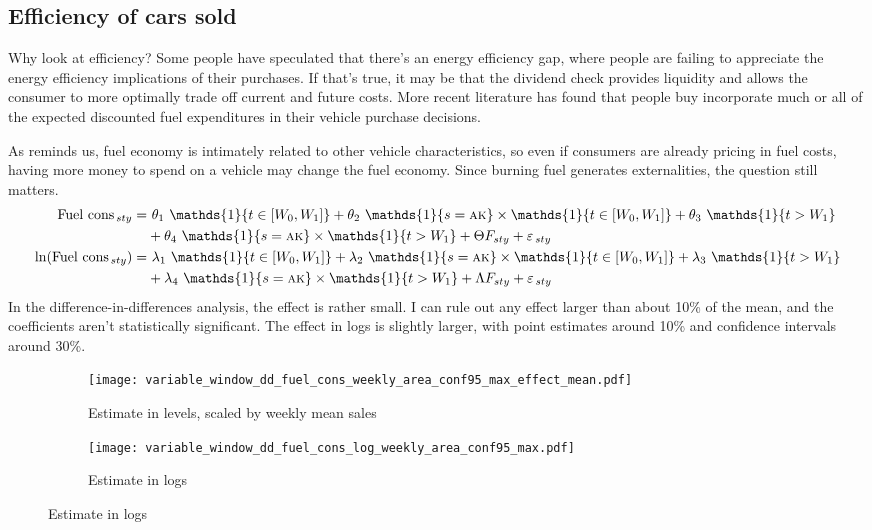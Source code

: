 \documentclass[11pt,letterpaper,oneside]{article}
\let\originalleft\left
\let\originalright\right
\renewcommand{\left}{\mathopen{}\mathclose\bgroup\originalleft}
\renewcommand{\right}{\aftergroup\egroup\originalright}
\newcommand{\indicator}[1]{\mathds{1}\left\{#1\right\}}
\newcommand{\anticipation}{\indicator{t \in [W_0, W_1]}}
\newcommand{\isAlaska}{\indicator{s = \textsc{ak}}}
\newcommand{\postWindow}{\indicator{t > W_1}}
\newcommand{\ddEqn}[3]{%
\text{#1}_{\, sty} = & \  #2_1 \ \anticipation + #2_2 \ \isAlaska \times \anticipation + #2_3 \ \postWindow \\ \nonumber
&+ #2_4 \ \isAlaska \times \postWindow + #3 F_{ sty} + \varepsilon_{\, sty}
}
\newcommand{\ddEqnLog}[3]{%
\ln\left(\text{#1}_{\, sty}\right) = & \  #2_1 \ \anticipation + #2_2 \ \isAlaska \times \anticipation + #2_3 \ \postWindow \\ \nonumber
&+ #2_4 \ \isAlaska \times \postWindow + #3 F_{ sty} + \varepsilon_{\, sty}
}
\begin{document}
\begin{doublespacing}
\subsection{Efficiency of cars sold}

Why look at efficiency?
Some people have speculated that there's an energy efficiency gap, where people are failing to appreciate the energy efficiency implications of their purchases.
If that's true, it may be that the dividend check provides liquidity and allows the consumer to more optimally trade off current and future costs.
More recent literature has found that people buy incorporate much \parencite{allcott2014gasoline} or all \parencite{busse2013consumers, grigolon2014consumer, sallee2016consumers} of the expected discounted fuel expenditures in their vehicle purchase decisions.

As \textcite{kiso2013automobilefueleconomy} reminds us, fuel economy is intimately related to other vehicle characteristics, so even if consumers are already pricing in fuel costs, having more money to spend on a vehicle may change the fuel economy.
Since burning fuel generates externalities, the question still matters. %
\begin{align}
    \label{eqn:fuel-cons}
    \ddEqn{Fuel cons}{\theta}{\Theta} \\
    \label{eqn:log-fuel-cons}
    \ddEqnLog{Fuel cons}{\lambda}{\Lambda}
\end{align}
In the difference\hyp{}in\hyp{}differences analysis, the effect is rather small.
I can rule out any effect larger than about 10\% of the mean, and the coefficients aren't statistically significant.
The effect in logs is slightly larger, with point estimates around 10\% and confidence intervals around 30\%.


\begin{figure}[!hbtp]
    \caption{Fuel consumption effects with varying windows}
    \label{fig:variable_window_fuel_cons}
    \begin{subfigure}{0.97\linewidth}
        \caption{Estimate in levels, scaled by weekly mean sales}
        \texttt{[image: variable\_window\_dd\_fuel\_cons\_weekly\_area\_conf95\_max\_effect\_mean.pdf]}
    \end{subfigure}
    \begin{subfigure}{0.97\linewidth}
        \caption{Estimate in logs}
        \texttt{[image: variable\_window\_dd\_fuel\_cons\_log\_weekly\_area\_conf95\_max.pdf]}
    \end{subfigure}


\end{figure}
\end{doublespacing}
\end{document}
